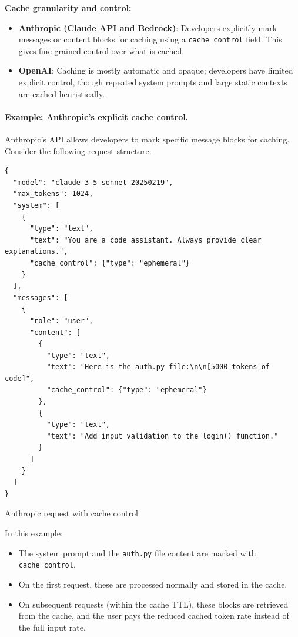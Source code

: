 \documentclass[english]{article}
\begin{document}
\textbf{Cache granularity and control:}
\begin{itemize}
    \item \textbf{Anthropic (Claude API and Bedrock)}: Developers explicitly mark messages or content blocks for caching using a \texttt{cache\_control} field. This gives fine-grained control over what is cached.
    \item \textbf{OpenAI}: Caching is mostly automatic and opaque; developers have limited explicit control, though repeated system prompts and large static contexts are cached heuristically.
\end{itemize}

\paragraph{Example: Anthropic's explicit cache control.}

Anthropic's API allows developers to mark specific message blocks for caching. Consider the following request structure:

\begin{listing}[H]
\begin{verbatim}
{
  "model": "claude-3-5-sonnet-20250219",
  "max_tokens": 1024,
  "system": [
    {
      "type": "text",
      "text": "You are a code assistant. Always provide clear explanations.",
      "cache_control": {"type": "ephemeral"}
    }
  ],
  "messages": [
    {
      "role": "user",
      "content": [
        {
          "type": "text",
          "text": "Here is the auth.py file:\n\n[5000 tokens of code]",
          "cache_control": {"type": "ephemeral"}
        },
        {
          "type": "text",
          "text": "Add input validation to the login() function."
        }
      ]
    }
  ]
}
\end{verbatim}
\caption{Anthropic request with cache control}
\end{listing}

In this example:
\begin{itemize}
    \item The system prompt and the \texttt{auth.py} file content are marked with \texttt{cache\_control}.
    \item On the first request, these are processed normally and stored in the cache.
    \item On subsequent requests (within the cache TTL), these blocks are retrieved from the cache, and the user pays the reduced cached token rate instead of the full input rate.
\end{itemize}
\end{document}
